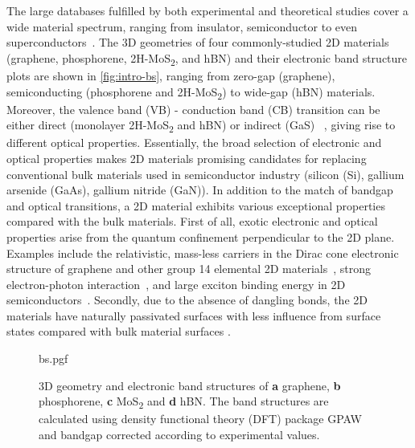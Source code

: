 The large databases fulfilled by both
experimental and theoretical studies cover a wide material spectrum,
ranging from insulator, semiconductor to even
superconductors~\cite{Novoselov_2016_vdW}.
%
The 3D geometries of four commonly-studied 2D materials (graphene,
phosphorene, 2H-MoS\textsubscript{2}, and hBN) and their electronic
band structure plots are shown in \autoref{fig:intro-bs}, ranging from
zero-gap (graphene), semiconducting (phosphorene and
2H-MoS\textsubscript{2}) to wide-gap (hBN) materials.
%
Moreover, the valence band (VB) - conduction band (CB) transition can
be either direct (monolayer 2H-MoS\textsubscript{2} and hBN) or
indirect (GaS) ~\cite{Xia_2014_2D_nanophoto_rev}, giving rise to different
optical properties.
%
Essentially, the broad selection of electronic and optical properties
makes 2D materials promising candidates for replacing conventional
bulk materials used in semiconductor industry (\eg silicon (Si),
gallium arsenide (GaAs), gallium nitride (GaN)).
%
In addition to the match of bandgap and optical transitions, a 2D
material exhibits various exceptional properties compared with the bulk materials.
%
First of all, exotic electronic and optical properties arise from the
quantum confinement perpendicular to the 2D
plane.
%
Examples include the relativistic, mass-less carriers in the Dirac
cone electronic structure of graphene and other group 14 elemental 2D
materials~\cite{Novoselov_2005_massless,Zhang_2005_QHE,Das_Sarma_2011_electron_gr},
strong electron-photon
interaction~\nocite{Nair_2008_transparent,Eda_2013_rev_opt}, and large
exciton binding energy in 2D
semiconductors~\cite{Mak_2010_mos2,Arnaud_2006_exc_hBN}.
%
Secondly, due to the absence of dangling bonds, the 2D materials have
naturally passivated surfaces with less influence from surface states
compared with bulk material surfaces
\cite{Novoselov_2016_vdW,Liu_2016_rev}.


\begin{figure}[htbp]
  \centering
  {bs.pgf}
  \caption{\label{fig:intro-bs} %
    3D geometry and electronic band structures of \textbf{a} graphene,
    \textbf{b} phosphorene, \textbf{c} MoS\textsubscript{2} and
    \textbf{d} hBN. The band structures are calculated using density
    functional theory (DFT) package GPAW~\cite{Mortensen_2005_gpaw}
    and bandgap corrected according to experimental values.}
\end{figure}

